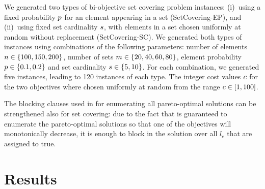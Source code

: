 We generated two types of  bi-objective set covering problem instances:
(i)~using a fixed probability $p$ for an element appearing in a set (SetCovering-EP), and (ii)~using fixed set cardinality $s$,
with elements in a set chosen uniformly at random without replacement (SetCovering-SC).
We generated both types of instances using combinations of the following parameters: number of elements $n\in\{100,150,200\}$,
number of sets $m\in\{20,40,60,80\}$, element probability $p\in\{0.1,0.2\}$ and set cardinality $s\in\{5,10\}$.
For each combination, we generated five instances, leading to 120 instances of each type.
The integer cost values $c$ for the two objectives where chosen uniformly at random from the range $c\in[1,100]$.

The blocking clauses used in \algname{} for enumerating all pareto-optimal solutions can be strengthened also for set covering:
due to the fact that \algname{} is guaranteed to enumerate the pareto-optimal solutions
so that one of the objectives will monotonically decrease, it is enough to block in \algname{} the
solution over all $l_e$ that are assigned to true.

\section{Results\label{sec:results}}